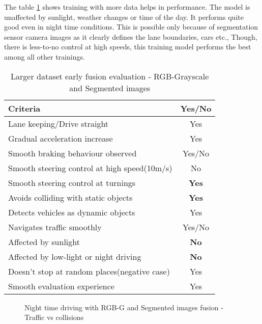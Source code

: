 The table \ref{table:earlyfusionrgbseg200k} shows training with more data helps in
performance. The model is unaffected by sunlight, weather changes or time of the day. It
performs quite good even in night time conditions. This is possible only because of
segmentation sensor camera images as it clearly defines the lane boundaries, cars etc.,
Though, there is less-to-no control at high speeds, this training model performs the best
among all other trainings.
\begin{table}[!ht]
    \centering
\begin{tabular}{lc}
    \toprule
    Criteria  & Yes/No \\\midrule
    Lane keeping/Drive straight  & Yes  \\
    Gradual acceleration increase  & Yes\\
    Smooth braking behaviour observed & Yes/No \\
    Smooth steering control at high speed(10m/s) & No \\
    Smooth steering control at turnings & \textbf{Yes}\\
    Avoids colliding with static objects & \textbf{Yes} \\
    Detects vehicles as dynamic objects & Yes \\
    Navigates traffic smoothly & Yes/No\\
    Affected by sunlight & \textbf{No} \\
    Affected by low-light or night driving & \textbf{No} \\
    Doesn't stop at random places(negative case) & Yes \\
    Smooth evaluation experience & Yes \\\bottomrule
\end{tabular}
\caption{Larger dataset early fusion evaluation - RGB-Grayscale and Segmented images}
\label{table:earlyfusionrgbseg200k}
\end{table}

\begin{figure}[!ht]
    \centering
    \def\svgwidth{0.3\textwidth}
    
    \caption{Night time driving with RGB-G and Segmented images fusion - Traffic vs
    collisions}
    \label{fig:224kdatafusionnight}
\end{figure}

